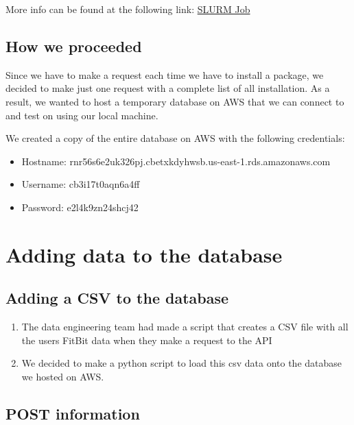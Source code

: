 \documentclass[]{book}
\providecommand{\tightlist}{%
  \setlength{\itemsep}{0pt}\setlength{\parskip}{0pt}}
\begin{document}
More info can be found at the following link:
\href{https://www.rcac.purdue.edu/knowledge/weber/run/slurm}{SLURM Job}

\subsection{How we proceeded}\label{how-we-proceeded}

Since we have to make a request each time we have to install a package,
we decided to make just one request with a complete list of all
installation. As a result, we wanted to host a temporary database on AWS
that we can connect to and test on using our local machine.

We created a copy of the entire database on AWS with the following
credentials:

\begin{itemize}
\tightlist
\item
  Hostname: rnr56s6e2uk326pj.cbetxkdyhwsb.us-east-1.rds.amazonaws.com
\item
  Username: cb3i17t0aqn6a4ff
\item
  Password: e2l4k9zn24shcj42
\end{itemize}

\section{Adding data to the database}\label{adding-data-to-the-database}

\subsection{Adding a CSV to the
database}\label{adding-a-csv-to-the-database}

\begin{enumerate}
\def\labelenumi{\arabic{enumi}.}
\tightlist
\item
  The data engineering team had made a script that creates a CSV file
  with all the users FitBit data when they make a request to the API
\item
  We decided to make a python script to load this csv data onto the
  database we hosted on AWS.
\end{enumerate}

\subsection{POST information}\label{post-information}
\end{document}
